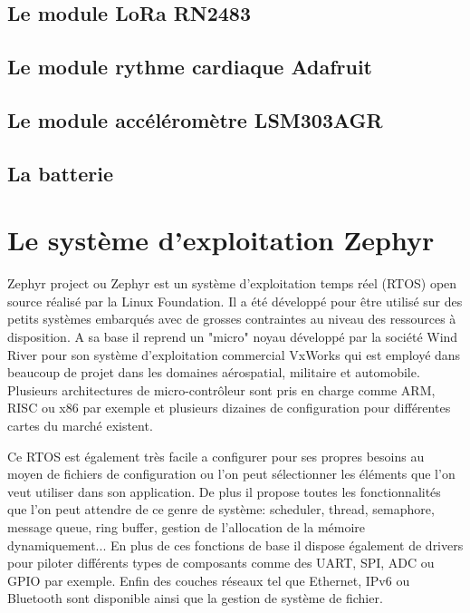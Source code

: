 \todo{}

\subsection{Le module LoRa RN2483}\label{ch:module_rn2483}

\todo{}

\subsection{Le module rythme cardiaque Adafruit}\label{ch:module_hr}

\todo{}

\subsection{Le module accéléromètre LSM303AGR}\label{ch:module_lsm303agr}

\todo{}

\subsection{La batterie}

\todo{}

\section{Le système d'exploitation Zephyr}

Zephyr project ou Zephyr est un système d'exploitation temps réel (RTOS) open source réalisé par la Linux Foundation. Il a été développé pour être utilisé sur des petits systèmes embarqués avec de grosses contraintes au niveau des ressources à disposition. A sa base il reprend un "micro" noyau développé par la société Wind River pour son système d'exploitation commercial VxWorks qui est employé dans beaucoup de projet dans les domaines aérospatial, militaire et automobile.
Plusieurs architectures de micro-contrôleur sont pris en charge comme ARM, RISC ou x86 par exemple et plusieurs dizaines de configuration pour différentes cartes du marché existent. 

Ce RTOS est également très facile a configurer pour ses propres besoins au moyen de fichiers de configuration ou l'on peut sélectionner les éléments que l'on veut utiliser dans son application. De plus il propose toutes les fonctionnalités que l'on peut attendre de ce genre de système: scheduler, thread, semaphore, message queue, ring buffer, gestion de l'allocation de la mémoire dynamiquement...
En plus de ces fonctions de base il dispose également de drivers pour piloter différents types de composants comme des UART, SPI, ADC ou GPIO par exemple. Enfin des couches réseaux tel que Ethernet, IPv6 ou Bluetooth sont disponible ainsi que la gestion de système de fichier. \cite{zephyr_web}

